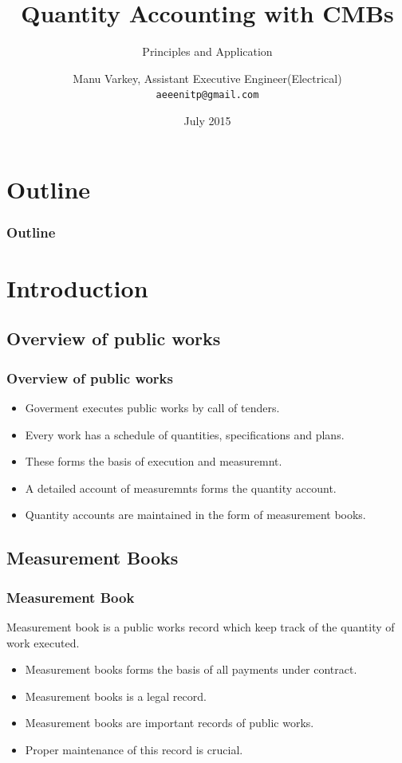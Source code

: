 \documentclass{beamer}
\title{Quantity Accounting with CMBs}
\subtitle{Principles and Application}
\author[Manu Varkey]{Manu Varkey, Assistant Executive Engineer(Electrical) \\ \texttt{aeeenitp@gmail.com}}
\institute{Calicut Project Electrical Sub-Division\\ Central Public Works Department}
\date{July 2015}
\begin{document}
\begin{frame}
  \titlepage
\end{frame}

\section*{Outline}
\begin{frame}
  \frametitle{Outline}
  \tableofcontents[pausesections]
\end{frame}

\section{Introduction}
\subsection{Overview of public works}
\begin{frame}
  \frametitle{Overview of public works}
  \begin{itemize}[<+->]
    \item Goverment executes public works by call of tenders.
    \item Every work has a schedule of quantities, specifications and plans.
    \item These forms the basis of execution and measuremnt.
    \item A detailed account of measuremnts forms the quantity account.
    \item Quantity accounts are maintained in the form of measurement books.
  \end{itemize}
\end{frame}

\subsection{Measurement Books}
\begin{frame}
  \frametitle{Measurement Book}
  \begin{block}{}
    \alert{Measurement book} is a public works record which keep track of the quantity of work executed.
  \end{block}
  \pause
  \begin{itemize}[<+->]
    \item Measurement books forms the basis of all payments under contract.
    \item Measurement books is a legal record.
    \item Measurement books are important records of public works.
    \item Proper maintenance of this record is crucial.
  \end{itemize}
\end{frame}
\end{document}
